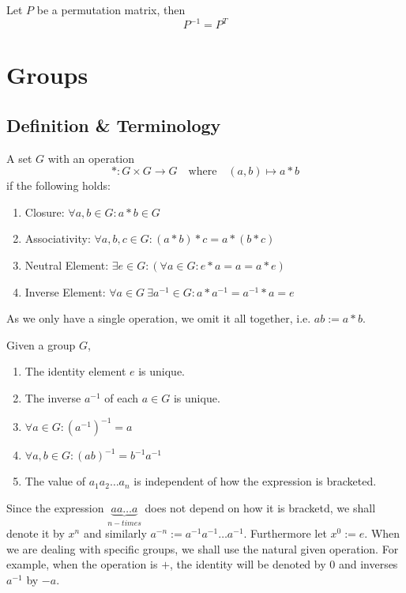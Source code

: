 \begin{proposition}
   Let \(P\) be a permutation matrix, then
   \[P^{-1} = P^T\]
\end{proposition}

\newpage

\newpage

\section{Groups}
\subsection{Definition \& Terminology}
\begin{definition}[Group]
   A set \(G\) with an operation
   \[\ast: G \times G \to G \quad\text{where}\quad (a, b) \mapsto a \ast b\]
   if the following holds:
   \begin{enumerate}[label=\roman*, align=Center]
      \item Closure: \(\forall a, b \in G: a \ast b \in G\)
      \item Associativity: \(\forall a, b, c \in G: (a \ast b) \ast c = a \ast (b \ast c)\)
      \item Neutral Element: \(\exists e \in G: (\forall a \in G: e \ast a = a = a \ast e)\)
      \item Inverse Element: \(\forall a \in G~\exists a^{-1} \in G: a \ast a^{-1} = a^{-1} \ast a = e\)
   \end{enumerate}
\end{definition}
\begin{remark}[Notation]
   As we only have a single operation, we omit it all together, i.e. \(ab := a \ast b\).
\end{remark}

\begin{proposition}
   Given a group \(G\),
   \begin{enumerate}[label=\roman*, align=Center]
      \item The identity element \(e\) is unique.
      \item The inverse \(a^{-1}\) of each \(a \in G\) is unique.
      \item \(\forall a \in G: (a^{-1})^{-1} = a\)
      \item \(\forall a, b \in G: (ab)^{-1} = b^{-1}a^{-1}\)
      \item The value of \(a_1a_2\ldots a_n\) is independent of how the expression is bracketed.
   \end{enumerate}
\end{proposition}
\begin{remark}[Notation]
   Since the expression \(\underbrace{a a \ldots a}_{n-times}\) does not depend on how it is bracketd, we shall denote it by \(x^n\) and similarly \(a^{-n} := a^{-1} a^{-1} \ldots a^{-1}\).
   Furthermore let \(x^0 := e\).
   When we are dealing with specific groups, we shall use the natural given operation.
   For example, when the operation is \(+\), the identity will be denoted by 0 and inverses \(a^{-1}\) by \(-a\).
\end{remark}

